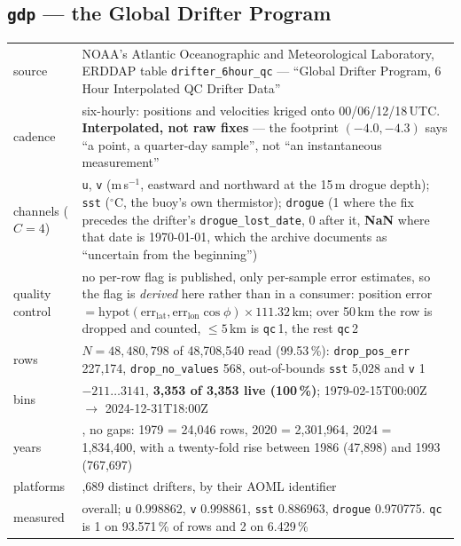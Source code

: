 \documentclass[10pt]{article}
\newcommand{\code}[1]{\texttt{#1}}
\begin{document}
\subsection{\code{gdp} --- the Global Drifter Program}

\begin{table}[h]
\centering\setlength{\tabcolsep}{5pt}\footnotesize
\begin{tabular}{@{}>{\raggedright\arraybackslash}p{2.8cm}>{\raggedright\arraybackslash}p{12.5cm}@{}}
\toprule
source & NOAA's Atlantic Oceanographic and Meteorological Laboratory, ERDDAP table \code{drifter\_6hour\_qc} --- ``Global Drifter Program, 6 Hour Interpolated QC Drifter Data'' \\
cadence & six-hourly: positions and velocities kriged onto 00/06/12/18\,UTC. \textbf{Interpolated, not raw fixes} --- the footprint $(-4.0, -4.3)$ says ``a point, a quarter-day sample'', not ``an instantaneous measurement'' \\
channels ($C = 4$) & \code{u}, \code{v} (m\,s$^{-1}$, eastward and northward at the 15\,m drogue depth); \code{sst} ($^\circ$C, the buoy's own thermistor); \code{drogue} (1 where the fix precedes the drifter's \code{drogue\_lost\_date}, 0 after it, \textbf{NaN} where that date is 1970-01-01, which the archive documents as ``uncertain from the beginning'') \\
quality control & no per-row flag is published, only per-sample error estimates, so the flag is \emph{derived} here rather than in a consumer: position error $= \mathrm{hypot}(\mathrm{err_{lat}}, \mathrm{err_{lon}}\cos\phi)\times 111.32$\,km; over 50\,km the row is dropped and counted, $\le 5$\,km is \code{qc}\,1, the rest \code{qc}\,2 \\
rows & $N = 48{,}480{,}798$ of 48,708,540 read (99.53\,\%): \code{drop\_pos\_err} 227,174, \code{drop\_no\_values} 568, out-of-bounds \code{sst} 5,028 and \code{v} 1 \\
bins & $-211 \ldots 3141$, \textbf{3,353 of 3,353 live (100\,\%)}; 1979-02-15T00:00Z $\to$ 2024-12-31T18:00Z \\
years & 46, no gaps: 1979 = 24,046 rows, 2020 = 2,301,964, 2024 = 1,834,400, with a twenty-fold rise between 1986 (47,898) and 1993 (767,697) \\
platforms & 28,689 distinct drifters, by their AOML identifier \\
measured & 0.963865 overall; \code{u} 0.998862, \code{v} 0.998861, \code{sst} 0.886963, \code{drogue} 0.970775. \code{qc} is 1 on 93.571\,\% of rows and 2 on 6.429\,\% \\

\end{tabular}
\end{table}
\end{document}
